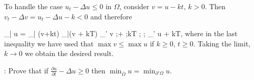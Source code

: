 To handle the case $u_t - \Delta u \leq 0$ in $\Omega$, consider $v = u - kt$, $k>0$. 
Then $v_t - \Delta v = u_t - \Delta u - k < 0$ and therefore 

\beq 
\max_{\bar \Omega} u = \max_{\bar \Omega} (v+kt) \leq \max_{\bar \Omega}(v + kT)\; \leq \; 
\max_{\pa' \Omega} v ;+ ;kT ; \leq ; \max_{\pa' \Omega} u + kT, 
\eeq %
where in the last inequality we have used that $\max v \leq \max u$ if $k\geq 0$, $t\geq 0$. 
Taking the limit, $k \rightarrow 0$ we obtain the desired result.

\ejer: Prove that if $\frac{\partial u}{\partial t} - \Delta u \geq 0$ then $\min_{\bar{\Omega}}u = \min_{\partial' \Omega} u$.





